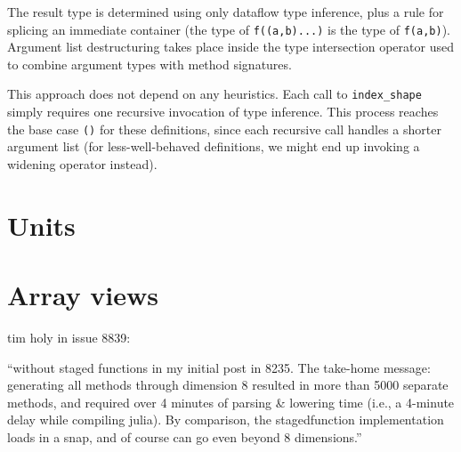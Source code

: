 



The result type is determined using only dataflow type inference, plus a
rule for splicing an immediate container (the type of \texttt{f((a,b)...)} is
the type of \texttt{f(a,b)}). Argument list destructuring takes place inside
the type intersection operator used to combine argument types with method
signatures.

This approach does not depend on any heuristics. Each call to \texttt{index\_shape}
simply requires one recursive invocation of type inference. This process reaches
the base case \texttt{()} for these definitions, since each recursive call
handles a shorter argument list (for less-well-behaved definitions, we might
end up invoking a widening operator instead).




\section{Units}


\section{Array views}

tim holy in issue 8839:

``without staged functions in my initial post in 8235. The take-home message: generating all methods through dimension 8 resulted in more than 5000 separate methods, and required over 4 minutes of parsing \& lowering time (i.e., a 4-minute delay while compiling julia). By comparison, the stagedfunction implementation loads in a snap, and of course can go even beyond 8 dimensions.''


